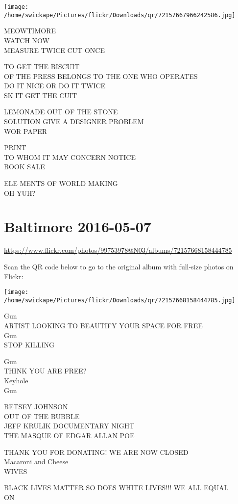 \documentclass[10pt,letterpaper]{article}
\begin{document}
\texttt{[image: /home/swickape/Pictures/flickr/Downloads/qr/72157667966242586.jpg]}


MEOWTIMORE\\
WATCH NOW\\
MEASURE TWICE CUT ONCE

TO GET THE BISCUIT\\
OF THE PRESS BELONGS TO THE ONE WHO OPERATES\\
DO IT NICE OR DO IT TWICE\\
SK IT GET THE CUIT

LEMONADE OUT OF THE STONE\\
SOLUTION GIVE A DESIGNER PROBLEM\\
WOR PAPER

PRINT\\
TO WHOM IT MAY CONCERN NOTICE\\
BOOK SALE

ELE MENTS OF WORLD MAKING\\
OH YUH?


\section*{Baltimore 2016-05-07}

\url{https://www.flickr.com/photos/99753978@N03/albums/72157668158444785}

Scan the QR code below to go to the original album with full-size photos on Flickr:

\texttt{[image: /home/swickape/Pictures/flickr/Downloads/qr/72157668158444785.jpg]}


Gun\\
ARTIST LOOKING TO BEAUTIFY YOUR SPACE FOR FREE\\
Gun\\
STOP KILLING

Gun\\
THINK YOU ARE FREE?\\
Keyhole\\
Gun

BETSEY JOHNSON\\
OUT OF THE BUBBLE\\
JEFF KRULIK DOCUMENTARY NIGHT\\
THE MASQUE OF EDGAR ALLAN POE

THANK YOU FOR DONATING!  WE ARE NOW CLOSED\\
Macaroni and Cheese\\
WIVES

BLACK LIVES MATTER SO DOES WHITE LIVES!!! WE ALL EQUAL\\
ON
\end{document}
